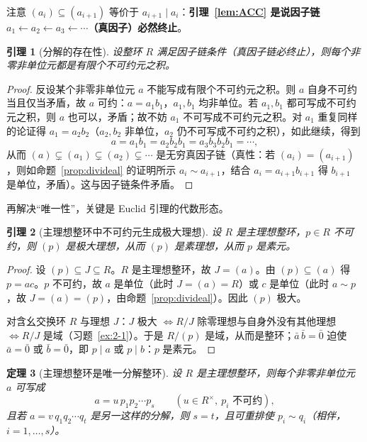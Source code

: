 \documentclass[a4paper,11pt]{ctexart}
\numberwithin{equation}{section}
\theoremstyle{plain}
\newtheorem{theorem}{定理}[section]
\newtheorem{lemma}[theorem]{引理}
\theoremstyle{definition}
\theoremstyle{remark}
\begin{document}
注意 $(a_i)\subseteq(a_{i+1})$ 等价于 $a_{i+1}\mid a_i$：\textbf{引理~\ref{lem:ACC} 是说因子链 $a_1 \leftarrow a_2\leftarrow a_3\leftarrow\cdots$（真因子）必然终止}。

\begin{lemma}[分解的存在性]\label{lem:existfactor}
设整环 $R$ 满足因子链条件（真因子链必终止），则每个非零非单位元都是有限个不可约元之积。
\end{lemma}

\begin{proof}
反设某个非零非单位元 $a$ 不能写成有限个不可约元之积。则 $a$ 自身不可约当且仅当矛盾，故 $a$ 可约：$a=a_1b_1$，$a_1,b_1$ 均非单位。若 $a_1,b_1$ 都可写成不可约元之积，则 $a$ 也可以，矛盾；故不妨 $a_1$ 不可写成不可约元之积。对 $a_1$ 重复同样的论证得 $a_1=a_2b_2$（$a_2,b_2$ 非单位，$a_2$ 仍不可写成不可约之积），如此继续，得到
\[
a=a_1b_1=a_2b_2b_1=a_3b_3b_2b_1=\cdots,
\]
从而 $(a)\subsetneq(a_1)\subsetneq(a_2)\subsetneq\cdots$ 是无穷真因子链（真性：若 $(a_i)=(a_{i+1})$，则如命题~\ref{prop:divideal} 的证明所示 $a_i\sim a_{i+1}$，结合 $a_i=a_{i+1}b_{i+1}$ 得 $b_{i+1}$ 是单位，矛盾）。这与因子链条件矛盾。
\end{proof}

再解决“唯一性”，关键是 Euclid 引理的代数形态。

\begin{lemma}[主理想整环中不可约元生成极大理想]\label{lem:maxideal}
设 $R$ 是主理想整环，$p\in R$ 不可约，则 $(p)$ 是极大理想，从而 $(p)$ 是素理想，从而 $p$ 是素元。
\end{lemma}

\begin{proof}
设 $(p)\subseteq J\subseteq R$。$R$ 是主理想整环，故 $J=(a)$。由 $(p)\subseteq(a)$ 得 $p=ac$。$p$ 不可约，故 $a$ 是单位（此时 $J=(a)=R$）或 $c$ 是单位（此时 $a\sim p$，故 $J=(a)=(p)$，由命题~\ref{prop:divideal}）。因此 $(p)$ 极大。

对含幺交换环 $R$ 与理想 $J$：$J$ 极大 $\iff R/J$ 除零理想与自身外没有其他理想 $\iff R/J$ 是域（习题~\ref{ex:2-1}）。于是 $R/(p)$ 是域，从而是整环；$\bar a\,\bar b=\bar 0$ 迫使 $\bar a=\bar 0$ 或 $\bar b=\bar 0$，即 $p\mid a$ 或 $p\mid b$：$p$ 是素元。
\end{proof}

\begin{theorem}[主理想整环是唯一分解整环]\label{thm:PIDUFD}
设 $R$ 是主理想整环，则每个非零非单位元 $a$ 可写成
\[
a=u\,p_1p_2\cdots p_s\qquad (u\in R^{\times},\ p_i \text{ 不可约}),
\]
且若 $a=v\,q_1q_2\cdots q_t$ 是另一这样的分解，则 $s=t$，且可重排使 $p_i\sim q_i$（相伴，$i=1,\dots,s$）。
\end{theorem}
\end{document}
